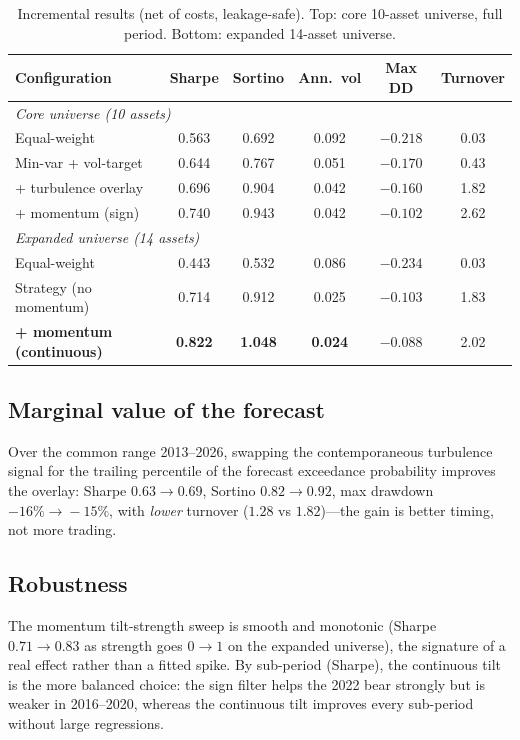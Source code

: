 \documentclass[11pt]{article}
\begin{document}
\begin{table}[h]\centering
\caption{Incremental results (net of costs, leakage-safe). Top: core 10-asset universe,
full period. Bottom: expanded 14-asset universe.}\label{tab:ladder}
\begin{tabular}{lccccc}
\toprule
Configuration & Sharpe & Sortino & Ann.\ vol & Max DD & Turnover \\
\midrule
\multicolumn{6}{l}{\emph{Core universe (10 assets)}}\\
Equal-weight                 & 0.563 & 0.692 & 0.092 & $-0.218$ & 0.03 \\
Min-var + vol-target         & 0.644 & 0.767 & 0.051 & $-0.170$ & 0.43 \\
\quad + turbulence overlay   & 0.696 & 0.904 & 0.042 & $-0.160$ & 1.82 \\
\quad + momentum (sign)      & 0.740 & 0.943 & 0.042 & $-0.102$ & 2.62 \\
\midrule
\multicolumn{6}{l}{\emph{Expanded universe (14 assets)}}\\
Equal-weight                 & 0.443 & 0.532 & 0.086 & $-0.234$ & 0.03 \\
Strategy (no momentum)       & 0.714 & 0.912 & 0.025 & $-0.103$ & 1.83 \\
\textbf{+ momentum (continuous)} & \textbf{0.822} & \textbf{1.048} & \textbf{0.024} & $\mathbf{-0.088}$ & 2.02 \\
\bottomrule
\end{tabular}
\end{table}

\subsection{Marginal value of the forecast}
Over the common range 2013--2026, swapping the contemporaneous turbulence signal for the trailing
percentile of the forecast exceedance probability improves the overlay: Sharpe $0.63\!\to\!0.69$,
Sortino $0.82\!\to\!0.92$, max drawdown $-16\%\!\to\!-15\%$, with \emph{lower} turnover
($1.28$ vs $1.82$)---the gain is better timing, not more trading.

\subsection{Robustness}
The momentum tilt-strength sweep is smooth and monotonic (Sharpe $0.71\!\to\!0.83$ as strength goes
$0\!\to\!1$ on the expanded universe), the signature of a real effect rather than a fitted spike. By
sub-period (Sharpe), the continuous tilt is the more balanced choice: the sign filter helps the 2022
bear strongly but is weaker in 2016--2020, whereas the continuous tilt improves every sub-period
without large regressions.
\end{document}
